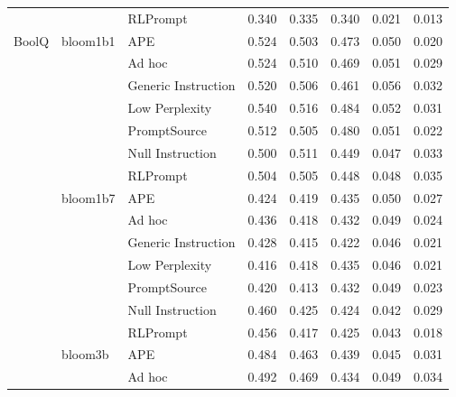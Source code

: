 \begin{supertabular}{lllrrrrr}
              &        & RLPrompt &            0.340 &           0.335 &          0.340 &        0.021 &    0.013 \\
BoolQ & bloom1b1 & APE &            0.524 &           0.503 &          0.473 &        0.050 &    0.020 \\
              &        & Ad hoc &            0.524 &           0.510 &          0.469 &        0.051 &    0.029 \\
              &        & Generic Instruction &            0.520 &           0.506 &          0.461 &        0.056 &    0.032 \\
              &        & Low Perplexity &            0.540 &           0.516 &          0.484 &        0.052 &    0.031 \\
              &        & PromptSource &            0.512 &           0.505 &          0.480 &        0.051 &    0.022 \\
              &        & Null Instruction &            0.500 &           0.511 &          0.449 &        0.047 &    0.033 \\
              &        & RLPrompt &            0.504 &           0.505 &          0.448 &        0.048 &    0.035 \\
              & bloom1b7 & APE &            0.424 &           0.419 &          0.435 &        0.050 &    0.027 \\
              &        & Ad hoc &            0.436 &           0.418 &          0.432 &        0.049 &    0.024 \\
              &        & Generic Instruction &            0.428 &           0.415 &          0.422 &        0.046 &    0.021 \\
              &        & Low Perplexity &            0.416 &           0.418 &          0.435 &        0.046 &    0.021 \\
              &        & PromptSource &            0.420 &           0.413 &          0.432 &        0.049 &    0.023 \\
              &        & Null Instruction &            0.460 &           0.425 &          0.424 &        0.042 &    0.029 \\
              &        & RLPrompt &            0.456 &           0.417 &          0.425 &        0.043 &    0.018 \\
              & bloom3b & APE &            0.484 &           0.463 &          0.439 &        0.045 &    0.031 \\
              &        & Ad hoc &            0.492 &           0.469 &          0.434 &        0.049 &    0.034 \\

\end{supertabular}
